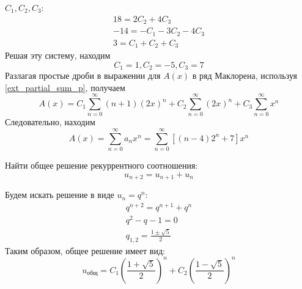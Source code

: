 \begin{task}
\begin{solution}
        $C_1, C_2, C_3$:
        \begin{gather*}
            18 = 2C_2 + 4C_3 \\
            -14 = -C_1 - 3C_2 - 4C_3 \\
            3 = C_1 + C_2 + C_3
        \end{gather*}
        Решая эту систему, находим
        \begin{equation*}
            C_1 = 1, C_2 = -5, C_3 = 7
        \end{equation*}
        Разлагая простые дроби в выражении для $A(x)$ в ряд Маклорена, используя \ref{ext_partial_sum_p},
        получаем
        \begin{equation*}
            A(x) = C_1 \sum_{n = 0}^{\infty} (n+1)(2x)^n + C_2 \sum_{n = 0}^{\infty} (2x)^n + C_3 \sum_{n = 0}^{\infty} x^n
        \end{equation*}
        Следовательно, находим
        \begin{equation*}
            A(x) = \sum_{n = 0}^{\infty} a_n x^n = \sum_{n = 0}^{\infty}\left[(n - 4) 2^n + 7\right] x^n
        \end{equation*}
    \end{solution}
\end{task}

\begin{task}
    Найти общее решение рекуррентного соотношения:
    \begin{equation*}
        u_{n+2} = u_{n+1} + u_n
    \end{equation*}
    \begin{solution}
        Будем искать решение в виде $u_n = q^n$:
        \begin{gather*}
            q^{n+2} = q^{n+1} + q^n \\
            q^2 - q - 1 = 0 \\
            q_{1, 2} = \frac{1 \pm \sqrt{5}}{2}
        \end{gather*}
        Таким образом, общее решение имеет вид:
        \begin{equation}
            u_{\text{общ}} = C_1 \left(\frac{1 + \sqrt{5}}{2}\right) ^ n + C_2\left(\frac{1 - \sqrt{5}}{2}\right) ^ n
        \end{equation}
    \end{solution}
\end{task}

